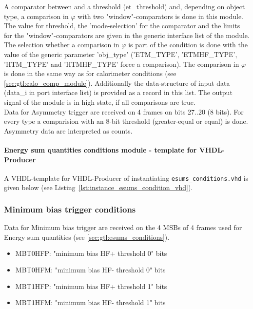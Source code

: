 A comparator between \et and a threshold (et\_threshold) and, depending on object type, a comparison in $\varphi$ with 
two "window"-comparators is done in this module. 
The value for \et threshold, the 'mode-selection' for the \et comparator and the limits for the "window"-comparators are given in the generic interface list of the module.
The selection whether a comparison in $\varphi$ is part of the condition is done with the value of the generic parameter 'obj\_type' 
('ETM\_TYPE', 'ETMHF\_TYPE', 'HTM\_TYPE' and 'HTMHF\_TYPE' force a comparison).
The comparison in $\varphi$ is done in the same way as for calorimeter conditions (see \ref{sec:gtl:calo_comp_module}).
Additionally the data-structure of input data (data\_i in port interface list) is provided
as a record in this list. The output signal of the module is in high state, if all comparisons are true.\\
Data for Asymmetry trigger are received on 4 frames on bits 27..20 (8 bits). For every type a comparision with an 8-bit threshold (greater-equal or equal) is done.
Asymmetry data are interpreted as counts.

\paragraph{Energy sum quantities conditions module - template for VHDL-Producer}
A VHDL-template for VHDL-Producer of instantiating \texttt{esums\_conditions.vhd} is given below (see Listing~\ref{lst:instance_esums_condition_vhd}).\\

\subsubsection{Minimum bias trigger conditions}
\label{sec:gtl:min_bias_conditions}

Data for Minimum bias trigger are received on the 4 MSBs of 4 frames used for Energy sum quantities (see \ref{sec:gtl:esums_conditions}). 

\begin{itemize}
\item MBT0HFP: "minimum bias HF+ threshold 0" bits
\item MBT0HFM: "minimum bias HF- threshold 0" bits
\item MBT1HFP: "minimum bias HF+ threshold 1" bits
\item MBT1HFM: "minimum bias HF- threshold 1" bits
\end{itemize}

